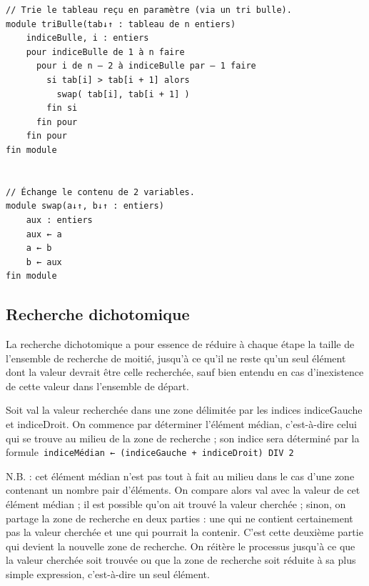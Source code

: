 \documentclass[11pt,a4paper]{article}
\begin{document}
            \par
        \begin{verbatim}
// Trie le tableau reçu en paramètre (via un tri bulle).
module triBulle(tab↓↑ : tableau de n entiers)
    indiceBulle, i : entiers
    pour indiceBulle de 1 à n faire
      pour i de n – 2 à indiceBulle par – 1 faire
        si tab[i] > tab[i + 1] alors
          swap( tab[i], tab[i + 1] )
        fin si
      fin pour
    fin pour
fin module


// Échange le contenu de 2 variables.
module swap(a↓↑, b↓↑ : entiers)
    aux : entiers
    aux ← a
    a ← b
    b ← aux
fin module
\end{verbatim}\subsection{Recherche dichotomique}
		    La recherche dichotomique a pour essence de r\'eduire \`a chaque \'etape la taille de l'ensemble
        de recherche de moiti\'e, jusqu'\`a ce qu'il ne reste qu'un seul \'el\'ement dont la valeur devrait
        \^etre celle recherch\'ee, sauf bien entendu en cas d'inexistence de cette valeur dans l'ensemble
        de d\'epart.
		  
            \par
        
		    Soit val la valeur recherch\'ee dans une zone d\'elimit\'ee par les indices indiceGauche et indiceDroit. 
		    On commence par d\'eterminer l'\'el\'ement m\'edian, c'est-\`a-dire celui qui se trouve \guillemotleft  au
        milieu \guillemotright  de la zone de recherche ; son indice sera d\'etermin\'e par la formule
        \,\verb|indiceMédian ← (indiceGauche + indiceDroit) DIV 2|\,
            \par
        
        N.B. : cet \'el\'ement m\'edian n'est pas tout \`a fait au milieu dans le cas d'une zone contenant un
        nombre pair d'\'el\'ements. On compare alors val avec la valeur de cet \'el\'ement m\'edian ; il est
        possible qu'on ait trouv\'e la valeur cherch\'ee ; sinon, on partage la zone de recherche en deux
        parties : une qui ne contient certainement pas la valeur cherch\'ee et une qui pourrait la
        contenir. C'est cette deuxi\`eme partie qui devient la nouvelle zone de recherche. On r\'eit\`ere
        le processus jusqu'\`a ce que la valeur cherch\'ee soit trouv\'ee ou que la zone de recherche soit
        r\'eduite \`a sa plus simple expression, c'est-\`a-dire un seul \'el\'ement.
		  
\end{document}

